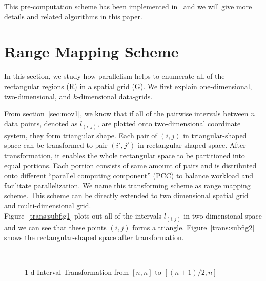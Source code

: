 \documentclass[AMA,LATO1COL]{WileyNJD-v2-bak}
\begin{document}
This pre-computation scheme has been implemented in~\cite{apweb} and we will give more details and related algorithms in this paper.

\section {Range Mapping Scheme} \label{RMS}
In this section, we study how parallelism helps to enumerate all of the rectangular regions (R) in a spatial grid (G). We first explain one-dimensional, two-dimensional, and $k$-dimensional data-grids.

From section~\ref{sec:mov1}, we know that if all of the pairwise intervals between $n$ data points, denoted as $l_{(i,j)}$, are plotted onto two-dimensional coordinate system, they form triangular shape. Each pair of $(i,j)$ in triangular-shaped space can be transformed to pair $(i',j')$ in rectangular-shaped space. After transformation, it enables the whole rectangular space to be partitioned into equal portions. Each portion consists of same amount of pairs and is distributed onto different ``parallel computing component'' (PCC) to balance workload and facilitate parallelization. We name this transforming scheme as range mapping scheme. This scheme can be directly extended to two dimensional spatial grid and multi-dimensional grid.\\
Figure~\ref{trans:subfig1} plots out all of the intervals $l_{(i,j)}$ in two-dimensional space and we can see that these points $(i,j)$ forms a triangle. Figure~\ref{trans:subfig2} shows the rectangular-shaped space after transformation.

\begin{figure}[h]
\centering
{}
~~
\caption{1-d Interval Transformation from $[n,n]$ to $[(n+1)/2,n]$}\label{modelBF}
\end{figure}
\end{document}
